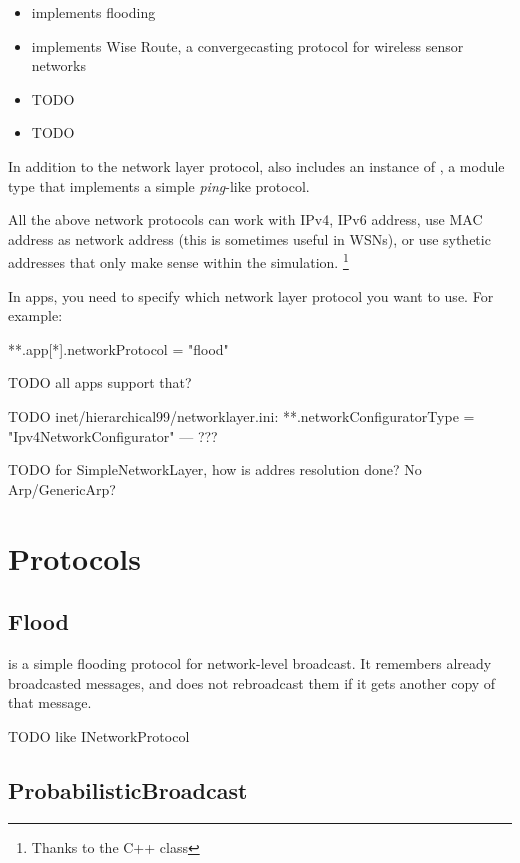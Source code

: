 \begin{itemize}
  \item {} implements flooding
  \item {} implements Wise Route, a convergecasting protocol for wireless sensor networks
  \item {} TODO
  \item {} TODO
\end{itemize}

In addition to the network layer protocol,  
also includes an instance of , a module type that
implements a simple \textit{ping}-like protocol.

All the above network protocols can work with IPv4, IPv6 address,
use MAC address as network address (this is sometimes useful in WSNs),
or use sythetic addresses that only make sense within the simulation.
\footnote{Thanks to the  C++ class}

In apps, you need to specify which network layer protocol you want to use.
For example:

\begin{inifile}
**.app[*].networkProtocol = "flood"
\end{inifile}

TODO all apps support that?

TODO inet/hierarchical99/networklayer.ini:
**.networkConfiguratorType = "Ipv4NetworkConfigurator" --- ???

TODO for SimpleNetworkLayer, how is addres resolution done? No Arp/GenericArp?

\section{Protocols}

\subsection{Flood}

 is a simple flooding protocol for network-level broadcast.
It remembers already broadcasted messages, and does not rebroadcast 
them if it gets another copy of that message.

TODO like INetworkProtocol

\subsection{ProbabilisticBroadcast}


